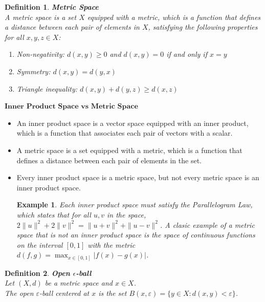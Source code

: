 \documentclass[11pt]{book} %
\newtheorem{definition}{Definition}[section]
\newtheorem*{example*}{Example}
\begin{document}
\begin{definition}{\textbf{Metric Space}} \\
    A metric space is a set \( X \) equipped with a metric, which is a function that defines a distance between each pair of elements in \( X \), satisfying the following properties for all \( x, y, z \in X \):
    \begin{enumerate}
        \item Non-negativity: \( d(x, y) \geq 0 \) and \( d(x, y) = 0 \) if and only if \( x = y \)
        \item Symmetry: \( d(x, y) = d(y, x) \)
        \item Triangle inequality: \( d(x, y) + d(y, z) \geq d(x, z) \)
    \end{enumerate}
\end{definition}

\( \textbf{Inner Product Space vs Metric Space} \)
\begin{itemize}
    \item An inner product space is a vector space equipped with an inner product, which is a function that associates each pair of vectors with a scalar.
    \item A metric space is a set equipped with a metric, which is a function that defines a distance between each pair of elements in the set.
    \item Every inner product space is a metric space, but not every metric space is an inner product space.
        \begin{example*}
            Each inner product space must satisfy the Parallelogram Law, which states that for all \( u, v \) in the space, \( 2\|u\|^2 + 2\|v\|^2 = \|u + v\|^2 + \|u - v\|^2 \).
            A clasic example of a metric space that is not an inner product space is the space of continuous functions on the interval \([0, 1]\) with the metric \( d(f, g) = \max_{x \in [0, 1]} |f(x) - g(x)| \).
        \end{example*}
\end{itemize}

\begin{definition}{ \textbf{Open $\epsilon$-ball} } \\
    Let \( (X, d) \) be a metric space and \( x \in X \). \\
    The open \(\varepsilon\)-ball centered at \( x \) is the set \(  B(x, \varepsilon) = \{ y \in X : d(x, y) < \varepsilon \} \).
\end{definition}
\end{document}
